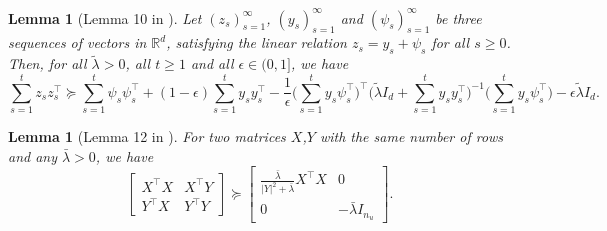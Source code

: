 \documentclass[11pt]{article}
\theoremstyle{plain}
\newtheorem{lem}[thm]{Lemma}
\theoremstyle{definition}
\theoremstyle{remark}
\newcommand{\R}{\mathbb{R}}
\begin{document}
\begin{lem}[Lemma 10 in \cite{jedra2022minimal}]\label{lem:preconditioner_expansion}
Let $(z_s)_{s=1}^\infty$, $(y_s)_{s=1}^\infty$ and $(\psi_s)_{s=1}^\infty$ be three sequences of vectors in $\R^d$, satisfying the linear relation $z_s = y_s + \psi_s$ for all $s\geq 0$. Then, for all $\tilde\lambda>0$, all $t\geq 1$ and all $\epsilon \in (0,1]$, we have
\[
 \sum_{s=1}^t z_s z_s^{\top} \succeq \sum_{s=1}^t \psi_s\psi_s^{\top} + (1-\epsilon)\sum_{s=1}^t y_s y_s^{\top} - \frac{1}{\epsilon}\bigg(\sum_{s=1}^t y_s  \psi_s^{\top}\bigg)^{\top}\bigg(\tilde\lambda I_d+\sum_{s=1}^{t}y_sy_s^{\top}\bigg)^{-1}\bigg(\sum_{s=1}^t y_s \psi_s^{\top}\bigg) -  \epsilon \tilde\lambda I_d.
\]
\end{lem}

\begin{lem}[Lemma 12 in \cite{jedra2022minimal}]\label{lem:tall_matrix}
For two matrices $X$,$Y$ with the same number of rows and any $\bar\lambda>0$, we have
\[
\begin{bmatrix}
X^\top X & X^\top Y\\
Y^\top X & Y^\top Y
\end{bmatrix} \succeq
\begin{bmatrix}
\frac{\bar\lambda}{|Y|^2+\bar\lambda}X^\top X & 0\\
0 & -\bar\lambda I_{n_u}
\end{bmatrix}.
\]
\end{lem}
\end{document}
